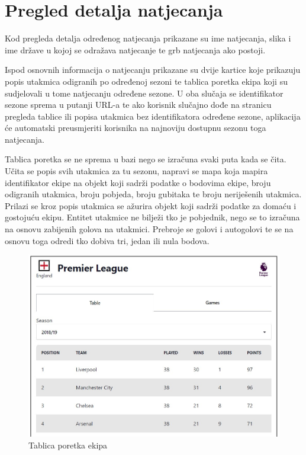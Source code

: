 \documentclass[times, utf8, zavrsni]{fer}
\begin{document}
\section{Pregled detalja natjecanja}

Kod pregleda detalja određenog natjecanja prikazane su ime natjecanja, slika i ime države u kojoj se odražava natjecanje te grb natjecanja ako postoji.

Ispod osnovnih informacija o natjecanju prikazane su dvije kartice koje prikazuju popis utakmica odigranih po određenoj sezoni te tablica poretka ekipa koji su sudjelovali u tome natjecanju određene sezone.
U oba slučaja se identifikator sezone sprema u putanji URL-a te ako korisnik slučajno dođe na stranicu pregleda tablice ili popisa utakmica bez identifikatora određene sezone, aplikacija će automatski preusmjeriti korisnika na najnoviju dostupnu sezonu toga natjecanja.

Tablica poretka se ne sprema u bazi nego se izračuna svaki puta kada se čita.
Učita se popis svih utakmica za tu sezonu, napravi se mapa koja mapira identifikator ekipe na objekt koji sadrži podatke o bodovima ekipe, broju odigranih utakmica, broju pobjeda, broju gubitaka te broju neriješenih utakmica.
Prilazi se kroz popis utakmica se ažurira objekt koji sadrži podatke za domaću i gostojuću ekipu.
Entitet utakmice ne bilježi tko je pobjednik, nego se to izračuna na osnovu zabijenih golova na utakmici. Prebroje se golovi i autogolovi te se na osnovu toga odredi tko dobiva tri, jedan ili nula bodova.

\begin{figure}[htb]
\centering
\includegraphics[width=14cm]{images/table.jpg}
\caption{Tablica poretka ekipa}
\label{fig:table}
\end{figure}
\end{document}
